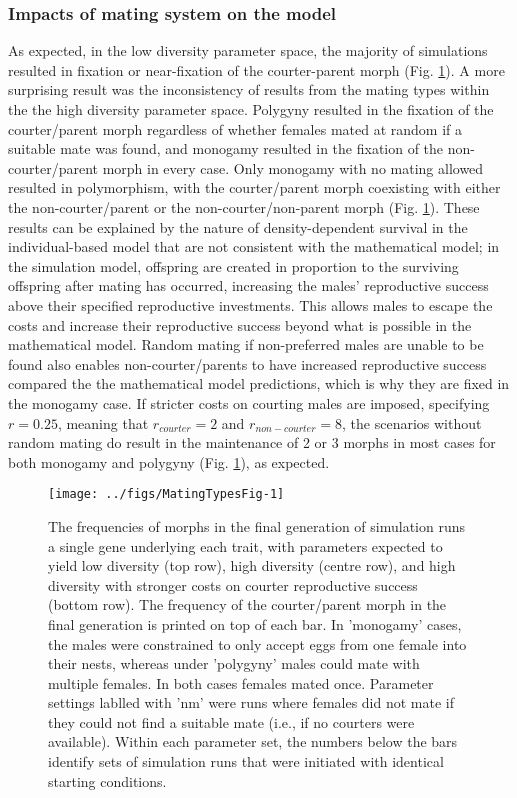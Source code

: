 \documentclass[
  11pt,
]{article}
\begin{document}
\hypertarget{impacts-of-mating-system-on-the-model}{%
\subsubsection{Impacts of mating system on the model}\label{impacts-of-mating-system-on-the-model}}

As expected, in the low diversity parameter space, the majority of
simulations resulted in fixation or near-fixation of the courter-parent
morph (Fig. \ref{fig:MatingTypesFig}). A more surprising result was the
inconsistency of results from the mating types within the the high
diversity parameter space. Polygyny resulted in the fixation of the
courter/parent morph regardless of whether females mated at random if a
suitable mate was found, and monogamy resulted in the fixation of the
non-courter/parent morph in every case. Only monogamy with no mating
allowed resulted in polymorphism, with the courter/parent morph
coexisting with either the non-courter/parent or the
non-courter/non-parent morph (Fig. \ref{fig:MatingTypesFig}). These
results can be explained by the nature of density-dependent survival in
the individual-based model that are not consistent with the mathematical
model; in the simulation model, offspring are created in proportion to
the surviving offspring after mating has occurred, increasing the males'
reproductive success above their specified reproductive investments.
This allows males to escape the costs and increase their reproductive
success beyond what is possible in the mathematical model. Random mating
if non-preferred males are unable to be found also enables
non-courter/parents to have increased reproductive success compared the
the mathematical model predictions, which is why they are fixed in the
monogamy case. If stricter costs on courting males are imposed,
specifying \(r=0.25\), meaning that \(r_{courter}=2\) and
\(r_{non-courter}=8\), the scenarios without random mating do result in
the maintenance of 2 or 3 morphs in most cases for both monogamy and
polygyny (Fig. \ref{fig:MatingTypesFig}), as expected.

\begin{figure}[H]
\texttt{[image: ../figs/MatingTypesFig-1]} \caption{The frequencies of morphs in the final generation of simulation runs a single gene underlying each trait, with parameters expected to yield low diversity (top row), high diversity (centre row), and high diversity with stronger costs on courter reproductive success (bottom row). The frequency of the courter/parent morph in the final generation is printed on top of each bar. In 'monogamy' cases, the males were constrained to only accept eggs from one female into their nests, whereas under 'polygyny' males could mate with multiple females. In both cases females mated once. Parameter settings lablled with 'nm' were runs where females did not mate if they could not find a suitable mate (i.e., if no courters were available). Within each parameter set, the numbers below the bars identify sets of simulation runs that were initiated with identical starting conditions.}\label{fig:MatingTypesFig}
\end{figure}
\end{document}
